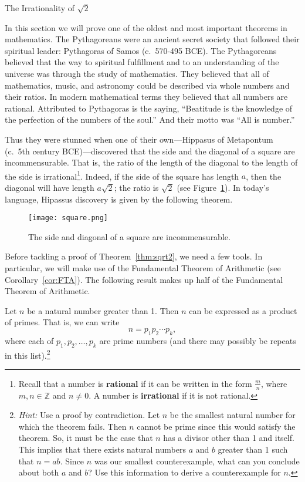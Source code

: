\begin{section}{The Irrationality of $\sqrt{2}$}

In this section we will prove one of the oldest and most important theorems in mathematics. The Pythagoreans were an ancient secret society that followed their spiritual leader: Pythagoras of Samos (c.\ 570-495 BCE). The Pythagoreans believed that the way to spiritual fulfillment and to an understanding of the universe was through the study of mathematics. They believed that all of mathematics, music, and astronomy could be described via whole numbers and their ratios. In modern mathematical terms they believed that all numbers are rational. Attributed to Pythagoras is the saying, ``Beatitude is the knowledge of the perfection of the numbers of the soul.'' And their motto was ``All is number.''

Thus they were stunned when one of their own---Hippasus of Metapontum (c.\ 5th century BCE)---discovered that the side and the diagonal of a square are incommensurable. That is, the ratio of the length of the diagonal to the length of the side is irrational\footnote{Recall that a number is \textbf{rational} if it can be written in the form $\frac{m}{n}$, where $m,n\in\mathbb{Z}$ and $n\neq 0$.  A number is \textbf{irrational} if it is not rational.}. Indeed, if the side of the square has length $a$, then the diagonal will have length $a\sqrt{2}$; the ratio is $\sqrt{2}$ (see Figure~\ref{fig:square}).  In today's language, Hipassus discovery is given by the following theorem.

\begin{figure}[ht]
\begin{center}
\texttt{[image: square.png]}
\end{center}
\vspace{-.5cm}
\caption{The side and diagonal of a square are incommensurable.}
\label{fig:square}
\end{figure}

Before tackling a proof of Theorem~\ref{thm:sqrt2}, we need a few tools.  In particular, we will make use of the Fundamental Theorem of Arithmetic (see Corollary~\ref{cor:FTA}).  The following result makes up half of the Fundamental Theorem of Arithmetic.

\begin{theorem}\label{thm:prodprimes}
Let $n$ be a natural number greater than 1.  Then $n$ can be expressed as a product of primes.  That is, we can write
\[
n=p_1 p_2 \cdots p_k,
\]
where each of $p_1, p_2, \ldots, p_k$ are prime numbers (and there may possibly be repeats in this list).\footnote{\emph{Hint:} Use a proof by contradiction.  Let $n$ be the smallest natural number for which the theorem fails.  Then $n$ cannot be prime since this would satisfy the theorem.  So, it must be the case that $n$ has a divisor other than 1 and itself.  This implies that there exists natural numbers $a$ and $b$ greater than 1 such that $n=ab$.  Since $n$ was our smallest counterexample, what can you conclude about both $a$ and $b$?  Use this information to derive a counterexample for $n$.}
\end{theorem}


\end{section}

